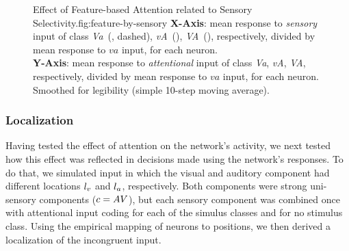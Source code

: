         \begin{figure}
            \begin{legend}{Effect of Feature-based Attention related to Sensory Selectivity.}{fig:feature-by-sensory}
                \textbf{X-Axis}: mean response to \emph{sensory} input of class \textit{Va}~(, dashed), \textit{vA}~(), \textit{VA}~(), respectively, divided by mean response to $va$ input, for each neuron.\\
                \textbf{Y-Axis}: mean response to \emph{attentional} input of class \textit{Va}, \textit{vA}, \textit{VA}, respectively, divided by mean response to $va$ input, for each neuron.\\
                Smoothed for legibility (simple 10-step moving average).
            \end{legend}
        \end{figure}


	\subsubsection{Localization}\label{sec:attn-and-localization}
		Having tested the effect of attention on the network's activity, we next tested how this effect was reflected in decisions made using the network's responses.
        To do that, we simulated input in which the visual and auditory component had different locations $l_v$ and $l_a$, respectively.
        Both components were strong uni-sensory components ($c=AV$), but each sensory component was combined once with attentional input coding for each of the simulus classes and for no stimulus class.
        Using the empirical mapping of neurons to positions, we then derived a localization of the incongruent input.

